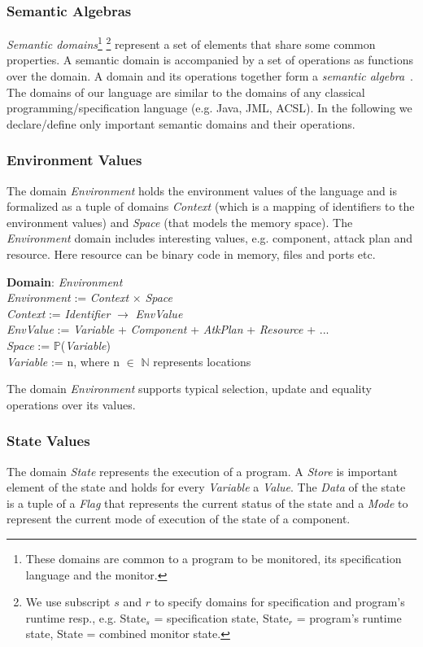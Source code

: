 \documentclass[conference]{IEEEtran}
\begin{document}
\subsubsection{Semantic Algebras}
\emph{Semantic domains}\footnote[1]{These domains are common to a program to be monitored, its specification language and the monitor.} \footnote[2]{We use subscript $s$ and $r$ to specify domains for specification and program's runtime resp., e.g. State$_s$ = specification state, State$_r$ = program's runtime state, State = combined monitor state.} represent a set of elements that share some common properties. A semantic domain is accompanied by a set of operations as functions over the domain. A domain and its operations together form a \emph{semantic algebra}~\cite{Schmidt86}.  The domains of our language are similar to the domains of any classical programming/specification language (e.g. Java, JML, ACSL). In the following we declare/define only important semantic domains and their operations.

\subsubsection*{Environment Values}
The domain \emph{Environment} holds the environment values of the language and is formalized as a tuple of domains \emph{Context} (which is a mapping of identifiers to the environment values) and \emph{Space} (that models the memory space). The \emph{Environment} domain includes interesting values, e.g. component, attack plan and resource. Here resource can be binary code in memory, files and ports etc.

\noindent\textbf{Domain}: \emph{Environment}\\
\emph{Environment} := \emph{Context} $\times$ \emph{Space}\\
\emph{Context} := \emph{Identifier} $\rightarrow$ \emph{EnvValue}
\\\emph{EnvValue} := \emph{Variable} + \emph{Component} + \emph{AtkPlan} + \emph{Resource} + ...
\\\emph{Space} := $\mathbb{P}$(\emph{Variable})\\
\emph{Variable} := n, where n $\in$ $\mathbb{N}$ represents locations


The domain \emph{Environment} supports typical selection, update and equality operations over its values.

\subsubsection*{State Values}
The domain \emph{State} represents the execution of a program. A \emph{Store} is important element of the state and holds for every \emph{Variable} a \emph{Value}. The \emph{Data} of the state is a tuple of a \emph{Flag} that represents the current status of the state and a \emph{Mode} to represent the current mode of execution of the state of a component.
\end{document}
